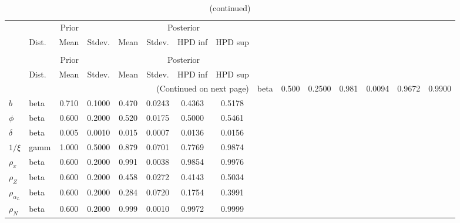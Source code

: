  
\begin{center}
\begin{longtable}{llcccccc} 
\caption{Results from Metropolis-Hastings (parameters)}
 \label{Table:MHPosterior:1}\\
\toprule 
  & \multicolumn{3}{c}{Prior}  &  \multicolumn{4}{c}{Posterior} \\
  \cmidrule(r{.75em}){2-4} \cmidrule(r{.75em}){5-8}
  & Dist. & Mean  & Stdev. & Mean & Stdev. & HPD inf & HPD sup\\
\midrule \endfirsthead 
\caption{(continued)}\\\toprule 
  & \multicolumn{3}{c}{Prior}  &  \multicolumn{4}{c}{Posterior} \\
  \cmidrule(r{.75em}){2-4} \cmidrule(r{.75em}){5-8}
  & Dist. & Mean  & Stdev. & Mean & Stdev. & HPD inf & HPD sup\\
\midrule \endhead 
\bottomrule \multicolumn{8}{r}{(Continued on next page)} \endfoot 
\bottomrule \endlastfoot 
$\alpha_L$ & beta &   0.500 & 0.2500 &   0.981& 0.0094 &  0.9672 &  0.9900 \\ 
$b$ & beta &   0.710 & 0.1000 &   0.470& 0.0243 &  0.4363 &  0.5178 \\ 
$\phi$ & beta &   0.600 & 0.2000 &   0.520& 0.0175 &  0.5000 &  0.5461 \\ 
${\delta}$ & beta &   0.005 & 0.0010 &   0.015& 0.0007 &  0.0136 &  0.0156 \\ 
${1/\xi}$ & gamm &   1.000 & 0.5000 &   0.879& 0.0701 &  0.7769 &  0.9874 \\ 
${\rho_x}$ & beta &   0.600 & 0.2000 &   0.991& 0.0038 &  0.9854 &  0.9976 \\ 
${\rho_Z}$ & beta &   0.600 & 0.2000 &   0.458& 0.0272 &  0.4143 &  0.5034 \\ 
${\rho_{\alpha_L}}$ & beta &   0.600 & 0.2000 &   0.284& 0.0720 &  0.1754 &  0.3991 \\ 
${\rho_N}$ & beta &   0.600 & 0.2000 &   0.999& 0.0010 &  0.9972 &  0.9999 \\ 
\end{longtable}
 \end{center}
